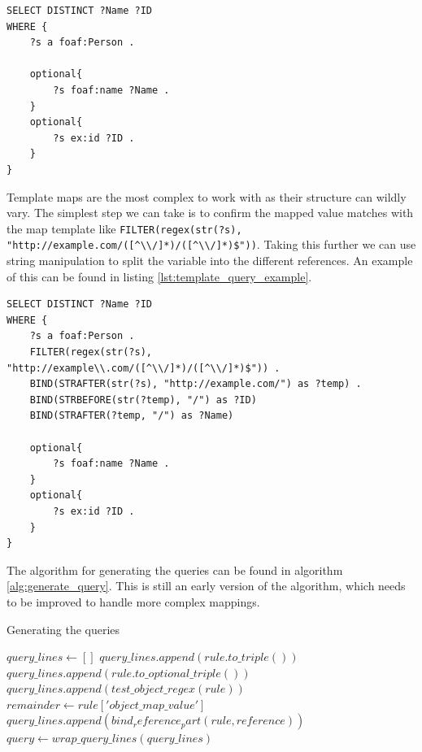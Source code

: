 \begin{lstlisting}[caption={Simple query example}, label={lst:simple_query_example}, captionpos=b]
SELECT DISTINCT ?Name ?ID
WHERE {
    ?s a foaf:Person .

    optional{
        ?s foaf:name ?Name .
    }
    optional{
        ?s ex:id ?ID .
    }
}
\end{lstlisting}    

Template maps are the most complex to work with as their structure can wildly vary. The simplest step we can take is to confirm the mapped value matches with the map template like
\texttt{FILTER(regex(str(?s), "http://example.com/([\textasciicircum\textbackslash\textbackslash/]*)/([\textasciicircum\textbackslash\textbackslash/]*)\$"))}. Taking this further we can use string manipulation to split the variable into the different references. An example of this can be found in listing \ref{lst:template_query_example}.

\begin{lstlisting}[caption={Template query example}, label={lst:template_query_example}, captionpos=b]
SELECT DISTINCT ?Name ?ID
WHERE {
    ?s a foaf:Person .
    FILTER(regex(str(?s), "http://example\\.com/([^\\/]*)/([^\\/]*)$")) .
    BIND(STRAFTER(str(?s), "http://example.com/") as ?temp) .
    BIND(STRBEFORE(str(?temp), "/") as ?ID)
    BIND(STRAFTER(?temp, "/") as ?Name)

    optional{
        ?s foaf:name ?Name .
    }
    optional{
        ?s ex:id ?ID .
    }
}
\end{lstlisting}

The algorithm for generating the queries can be found in algorithm \ref{alg:generate_query}. This is still an early version of the algorithm, which needs to be improved to handle more complex mappings.

\begin{algorithm} 
    \caption{Generating the queries}
    \label{alg:generate_query}
    \begin{algorithmic}[1]
        \State $query\_lines \gets []$
                \State $query\_lines.append(rule.to\_triple())$ 
                \State $query\_lines.append(rule.to\_optional\_triple())$
                \State $query\_lines.append(test\_object\_regex(rule))$
                \State $remainder \gets rule['object\_map\_value']$
                    \State $query\_lines.append(bind_reference_part(rule, reference))$
                \EndFor
            \EndIf
        \EndFor
        \State $query \gets wrap\_query\_lines(query\_lines)$
    \end{algorithmic}
\end{algorithm}

